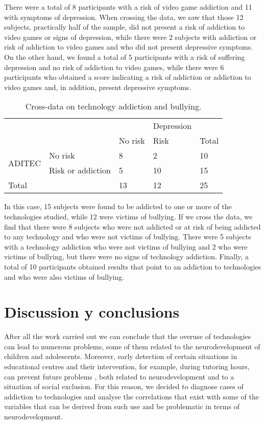 \documentclass[english]{textolivre}
\begin{document}
There were a total of 8 participants with a risk of video game addiction and 11 with symptoms of depression. When crossing the data, we saw that those 12 subjects, practically half of the sample, did not present a risk of addiction to video games or signs of depression, while there were 2 subjects with addiction or risk of addiction to video games and who did not present depressive symptoms. On the other hand, we found a total of 5 participants with a risk of suffering depression and no risk of addiction to video games, while there were 6 participants who obtained a score indicating a risk of addiction or addiction to video games and, in addition, present depressive symptoms.

\begin{table}[htpb]
\centering
\begin{threeparttable}
\caption{Cross-data on technology addiction and bullying.}\label{tbl05}
\begin{tabular}{@{}*{5}{l}@{}}
\toprule
 & & & Depression & \\
 & & No risk & Risk & Total \\
\midrule
\multirow{2}{*}{ADITEC} & No risk & 8 & 2 & 10 \\
 & Risk or addiction & 5 & 10 & 15 \\
Total & & 13 & 12 & 25 \\
\bottomrule
\end{tabular}
\end{threeparttable}
\end{table}

In this case, 15 subjects were found to be addicted to one or more of the technologies studied, while 12 were victims of bullying. If we cross the data, we find that there were 8 subjects who were not addicted or at risk of being addicted to any technology and who were not victims of bullying. There were 5 subjects with a technology addiction who were not victims of bullying and 2 who were victims of bullying, but there were no signs of technology addiction. Finally, a total of 10 participants obtained results that point to an addiction to technologies and who were also victims of bullying.



\section{Discussion y conclusions}\label{sec-disc}
After all the work carried out we can conclude that the overuse of technologies can lead to numerous problems, some of them related to the neurodevelopment of children and adolescents. Moreover, early detection of certain situations in educational centres and their intervention, for example, during tutoring hours, can prevent future problems \cite{avalos2022}, %
both related to neurodevelopment and to a situation of social exclusion. For this reason, we decided to diagnose cases of addiction to technologies and analyse the correlations that exist with some of the variables that can be derived from such use and be problematic in terms of neurodevelopment.
\end{document}
